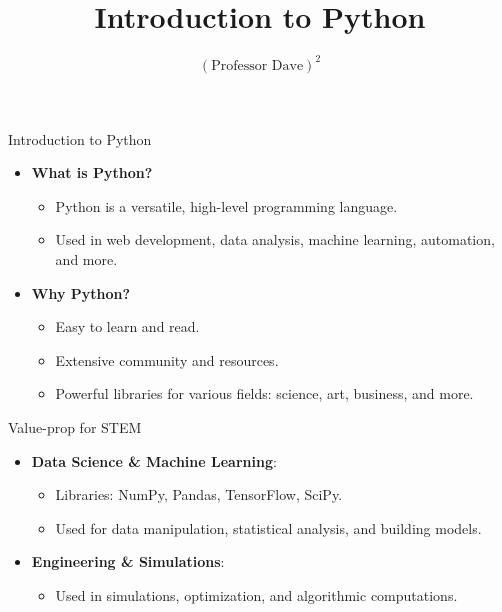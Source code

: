 \documentclass[
  ignorenonframetext,
]{beamer}
\title{Introduction to Python}
\author{\((\text{Professor Dave})^2\)}
\date{}
\institute{The University of Austin}
\providecommand{\tightlist}{%
  \setlength{\itemsep}{0pt}\setlength{\parskip}{0pt}}
\begin{document}
\frame{\titlepage}

\begin{frame}{Introduction to Python}
\label{introduction-to-python}
\begin{itemize}
\tightlist
\item
  \textbf{What is Python?}

  \begin{itemize}
  \tightlist
  \item
    Python is a versatile, high-level programming language.
  \item
    Used in web development, data analysis, machine learning,
    automation, and more.
  \end{itemize}

  \vspace{.5cm}
\item
  \textbf{Why Python?}

  \begin{itemize}
  \tightlist
  \item
    Easy to learn and read.
  \item
    Extensive community and resources.
  \item
    Powerful libraries for various fields: science, art, business, and
    more.
  \end{itemize}
\end{itemize}
\end{frame}

\begin{frame}{Value-prop for STEM}
\label{value-prop-for-stem}
\begin{itemize}
\tightlist
\item
  \textbf{Data Science \& Machine Learning}:

  \begin{itemize}
  \tightlist
  \item
    Libraries: NumPy, Pandas, TensorFlow, SciPy.
  \item
    Used for data manipulation, statistical analysis, and building
    models.
  \end{itemize}

  \vspace{.5cm}
\item
  \textbf{Engineering \& Simulations}:

  \begin{itemize}
  \tightlist
  \item
    Used in simulations, optimization, and algorithmic computations.
  \end{itemize}
\end{itemize}
\end{frame}
\end{document}
